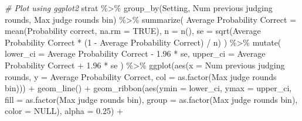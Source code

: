 \documentclass[
]{article}
\newenvironment{Shaded}{\begin{snugshade}}{\end{snugshade}}
\newcommand{\AttributeTok}[1]{\textcolor[rgb]{0.77,0.63,0.00}{#1}}
\newcommand{\CommentTok}[1]{\textcolor[rgb]{0.56,0.35,0.01}{\textit{#1}}}
\newcommand{\ConstantTok}[1]{\textcolor[rgb]{0.00,0.00,0.00}{#1}}
\newcommand{\DecValTok}[1]{\textcolor[rgb]{0.00,0.00,0.81}{#1}}
\newcommand{\FloatTok}[1]{\textcolor[rgb]{0.00,0.00,0.81}{#1}}
\newcommand{\FunctionTok}[1]{\textcolor[rgb]{0.00,0.00,0.00}{#1}}
\newcommand{\NormalTok}[1]{#1}
\newcommand{\OtherTok}[1]{\textcolor[rgb]{0.56,0.35,0.01}{#1}}
\newcommand{\SpecialCharTok}[1]{\textcolor[rgb]{0.00,0.00,0.00}{#1}}
\newcommand{\StringTok}[1]{\textcolor[rgb]{0.31,0.60,0.02}{#1}}
\begin{document}
\begin{Shaded}
\begin{Highlighting}[]
\CommentTok{\# Plot using ggplot2}
\NormalTok{strat }\SpecialCharTok{\%\textgreater{}\%}
  \FunctionTok{group\_by}\NormalTok{(Setting, }\StringTok{\textasciigrave{}}\AttributeTok{Num previous judging rounds}\StringTok{\textasciigrave{}}\NormalTok{, }\StringTok{\textasciigrave{}}\AttributeTok{Max judge rounds bin}\StringTok{\textasciigrave{}}\NormalTok{) }\SpecialCharTok{\%\textgreater{}\%}
  \FunctionTok{summarize}\NormalTok{(}
    \StringTok{\textasciigrave{}}\AttributeTok{Average Probability Correct}\StringTok{\textasciigrave{}} \OtherTok{=} \FunctionTok{mean}\NormalTok{(}\StringTok{\textasciigrave{}}\AttributeTok{Probability correct}\StringTok{\textasciigrave{}}\NormalTok{, }\AttributeTok{na.rm =} \ConstantTok{TRUE}\NormalTok{),}
    \AttributeTok{n =} \FunctionTok{n}\NormalTok{(),}
    \AttributeTok{se =} \FunctionTok{sqrt}\NormalTok{(}\StringTok{\textasciigrave{}}\AttributeTok{Average Probability Correct}\StringTok{\textasciigrave{}} \SpecialCharTok{*}\NormalTok{ (}\DecValTok{1} \SpecialCharTok{{-}} \StringTok{\textasciigrave{}}\AttributeTok{Average Probability Correct}\StringTok{\textasciigrave{}}\NormalTok{) }\SpecialCharTok{/}\NormalTok{ n)}
\NormalTok{  ) }\SpecialCharTok{\%\textgreater{}\%}
  \FunctionTok{mutate}\NormalTok{(}
    \AttributeTok{lower\_ci =} \StringTok{\textasciigrave{}}\AttributeTok{Average Probability Correct}\StringTok{\textasciigrave{}} \SpecialCharTok{{-}} \FloatTok{1.96} \SpecialCharTok{*}\NormalTok{ se,}
    \AttributeTok{upper\_ci =} \StringTok{\textasciigrave{}}\AttributeTok{Average Probability Correct}\StringTok{\textasciigrave{}} \SpecialCharTok{+} \FloatTok{1.96} \SpecialCharTok{*}\NormalTok{ se}
\NormalTok{  ) }\SpecialCharTok{\%\textgreater{}\%}
  \FunctionTok{ggplot}\NormalTok{(}\FunctionTok{aes}\NormalTok{(}\AttributeTok{x =} \StringTok{\textasciigrave{}}\AttributeTok{Num previous judging rounds}\StringTok{\textasciigrave{}}\NormalTok{, }\AttributeTok{y =} \StringTok{\textasciigrave{}}\AttributeTok{Average Probability Correct}\StringTok{\textasciigrave{}}\NormalTok{, }\AttributeTok{col =} \FunctionTok{as.factor}\NormalTok{(}\StringTok{\textasciigrave{}}\AttributeTok{Max judge rounds bin}\StringTok{\textasciigrave{}}\NormalTok{))) }\SpecialCharTok{+}
  \FunctionTok{geom\_line}\NormalTok{() }\SpecialCharTok{+}
  \FunctionTok{geom\_ribbon}\NormalTok{(}\FunctionTok{aes}\NormalTok{(}\AttributeTok{ymin =}\NormalTok{ lower\_ci, }\AttributeTok{ymax =}\NormalTok{ upper\_ci, }\AttributeTok{fill =} \FunctionTok{as.factor}\NormalTok{(}\StringTok{\textasciigrave{}}\AttributeTok{Max judge rounds bin}\StringTok{\textasciigrave{}}\NormalTok{), }\AttributeTok{group =} \FunctionTok{as.factor}\NormalTok{(}\StringTok{\textasciigrave{}}\AttributeTok{Max judge rounds bin}\StringTok{\textasciigrave{}}\NormalTok{), }\AttributeTok{color =} \ConstantTok{NULL}\NormalTok{), }\AttributeTok{alpha =} \FloatTok{0.25}\NormalTok{) }\SpecialCharTok{+}

\end{Highlighting}
\end{Shaded}
\end{document}
